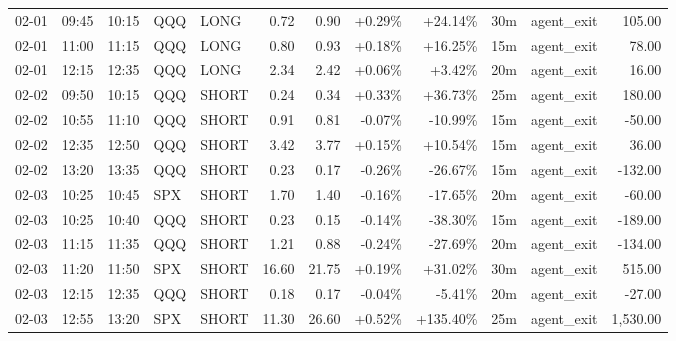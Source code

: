 \documentclass[11pt,a4paper]{article}
\begin{document}
\begin{center}
\begin{longtable}{>{\color{txtmain}}l l l l l r r r r r >{\color{txtmain}}l r}
02-01 & 09:45 & 10:15 & QQQ & LONG & 0.72 & 0.90 & \textcolor{wingreen}{+0.29\%} & \textcolor{wingreen}{+24.14\%} & 30m & agent\_exit & \textcolor{wingreen}{105.00} \\
02-01 & 11:00 & 11:15 & QQQ & LONG & 0.80 & 0.93 & \textcolor{wingreen}{+0.18\%} & \textcolor{wingreen}{+16.25\%} & 15m & agent\_exit & \textcolor{wingreen}{78.00} \\
02-01 & 12:15 & 12:35 & QQQ & LONG & 2.34 & 2.42 & \textcolor{wingreen}{+0.06\%} & \textcolor{wingreen}{+3.42\%} & 20m & agent\_exit & \textcolor{wingreen}{16.00} \\
02-02 & 09:50 & 10:15 & QQQ & SHORT & 0.24 & 0.34 & \textcolor{wingreen}{+0.33\%} & \textcolor{wingreen}{+36.73\%} & 25m & agent\_exit & \textcolor{wingreen}{180.00} \\
02-02 & 10:55 & 11:10 & QQQ & SHORT & 0.91 & 0.81 & \textcolor{lossred}{-0.07\%} & \textcolor{lossred}{-10.99\%} & 15m & agent\_exit & \textcolor{lossred}{-50.00} \\
02-02 & 12:35 & 12:50 & QQQ & SHORT & 3.42 & 3.77 & \textcolor{wingreen}{+0.15\%} & \textcolor{wingreen}{+10.54\%} & 15m & agent\_exit & \textcolor{wingreen}{36.00} \\
02-02 & 13:20 & 13:35 & QQQ & SHORT & 0.23 & 0.17 & \textcolor{lossred}{-0.26\%} & \textcolor{lossred}{-26.67\%} & 15m & agent\_exit & \textcolor{lossred}{-132.00} \\
02-03 & 10:25 & 10:45 & SPX & SHORT & 1.70 & 1.40 & \textcolor{lossred}{-0.16\%} & \textcolor{lossred}{-17.65\%} & 20m & agent\_exit & \textcolor{lossred}{-60.00} \\
02-03 & 10:25 & 10:40 & QQQ & SHORT & 0.23 & 0.15 & \textcolor{lossred}{-0.14\%} & \textcolor{lossred}{-38.30\%} & 15m & agent\_exit & \textcolor{lossred}{-189.00} \\
02-03 & 11:15 & 11:35 & QQQ & SHORT & 1.21 & 0.88 & \textcolor{lossred}{-0.24\%} & \textcolor{lossred}{-27.69\%} & 20m & agent\_exit & \textcolor{lossred}{-134.00} \\
02-03 & 11:20 & 11:50 & SPX & SHORT & 16.60 & 21.75 & \textcolor{wingreen}{+0.19\%} & \textcolor{wingreen}{+31.02\%} & 30m & agent\_exit & \textcolor{wingreen}{515.00} \\
02-03 & 12:15 & 12:35 & QQQ & SHORT & 0.18 & 0.17 & \textcolor{lossred}{-0.04\%} & \textcolor{lossred}{-5.41\%} & 20m & agent\_exit & \textcolor{lossred}{-27.00} \\
02-03 & 12:55 & 13:20 & SPX & SHORT & 11.30 & 26.60 & \textcolor{wingreen}{+0.52\%} & \textcolor{wingreen}{+135.40\%} & 25m & agent\_exit & \textcolor{wingreen}{1,530.00} \\

\end{longtable}
\end{center}
\end{document}
